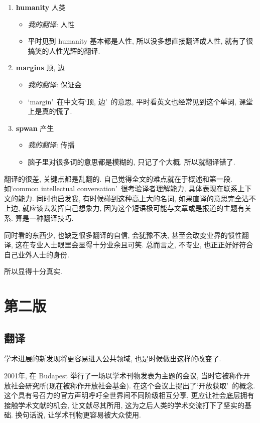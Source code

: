 \documentclass[a4paper, 12pt, UTF8]{article}
\begin{document}
\begin{enumerate}[\hspace{0.5cm} 1.]
    \item {\bfseries humanity} 人类
          \begin{itemize}
              \item \emph{我的翻译:} 人性
              \item 平时见到 humanity 基本都是人性, 所以没多想直接翻译成人性, 就有了很搞笑的人性光辉的翻译.
          \end{itemize}
    \item {\bfseries margins} 顶, 边
          \begin{itemize}
              \item \emph{我的翻译:} 保证金 
              \item \lq margin\rq\ 在中文有\lq 顶, 边\rq\ 的意思, 平时看英文也经常见到这个单词, 课堂上是真的慌了.
          \end{itemize}
    \item {\bfseries spwan} 产生
          \begin{itemize}
              \item \emph{我的翻译:} 传播
              \item 脑子里对很多词的意思都是模糊的, 只记了个大概. 所以就翻译错了.
          \end{itemize}
\end{enumerate}

翻译的很差, 关键点都是乱翻的. 自己觉得全文的难点就在于概述和第一段. 如\lq common intellectual conversation\rq\ 很考验译者理解能力, 具体表现在联系上下文的能力. 同时也启发我, 有时候碰到这种高上大的名词, 如果直译的意思完全沾不上边, 就应该去发挥自己想象力, 因为这个短语极可能与文章或是报道的主题有关系. 算是一种翻译技巧. 

同时看的东西少, 也缺乏很多翻译的自信, 会犹豫不决, 甚至会改变业界的惯性翻译, 这在专业人士眼里会显得十分业余且可笑. 总而言之, 不专业, 也正正好好符合自己业外人士的身份.

所以显得十分真实.

\newpage
\section{第二版}
\subsection{翻译}
学术进展的新发现将更容易进入公共领域, 也是时候做出这样的改变了.

2001年, 在 Budapest 举行了一场以学术刊物发表为主题的会议, 当时它被称作开放社会研究所(现在被称作开放社会基金). 在这个会议上提出了\lq 开放获取\rq\ 的概念. 这个具有号召力的官方声明呼吁全世界间不同阶级相互分享, 更应让社会底层拥有接触学术文献的机会, 让文献尽其所用, 这为之后人类的学术交流打下了坚实的基础. 换句话说, 让学术刊物更容易被大众使用.
\end{document}
